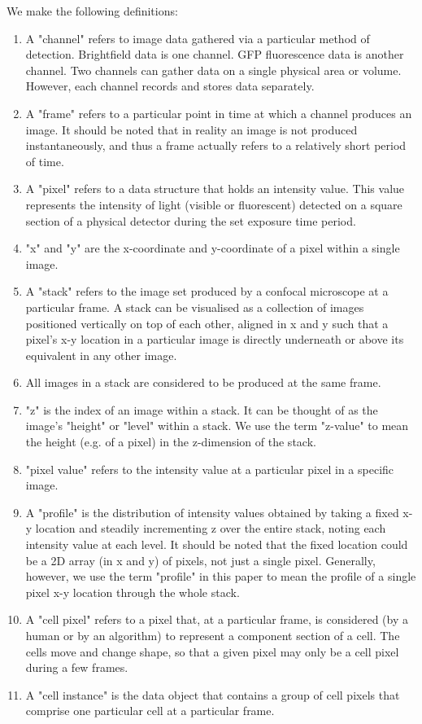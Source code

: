 We make the following definitions:
\begin{enumerate}
\item A "channel" refers to image data gathered via a particular method of detection. Brightfield data is one channel. GFP fluorescence data is another channel. Two channels can gather data on a single physical area or volume. However, each channel records and stores data separately.
\item A "frame" refers to a particular point in time at which a channel produces an image. It should be noted that in reality an image is not produced instantaneously, and thus a frame actually refers to a relatively short period of time.
\item A "pixel" refers to a data structure that holds an intensity value. This value represents the intensity of light (visible or fluorescent) detected on a square section of a physical detector during the set exposure time period.
\item "x" and "y" are the x-coordinate and y-coordinate of a pixel within a single image.
\item A "stack" refers to the image set produced by a confocal microscope at a particular frame. A stack can be visualised as a collection of images positioned vertically on top of each other, aligned in x and y such that a pixel's x-y location in a particular image is directly underneath or above its equivalent in any other image.
\item All images in a stack are considered to be produced at the same frame.
\item "z" is the index of an image within a stack. It can be thought of as the image's "height" or "level" within a stack. We use the term "z-value" to mean the height (e.g. of a pixel) in the z-dimension of the stack.
\item "pixel value" refers to the intensity value at a particular pixel in a specific image.
\item A "profile" is the distribution of intensity values obtained by taking a fixed x-y location and steadily incrementing z over the entire stack, noting each intensity value at each level. It should be noted that the fixed location could be a 2D array (in x and y) of pixels, not just a single pixel. Generally, however, we use the term "profile" in this paper to mean the profile of a single pixel x-y location through the whole stack.
\item A "cell pixel" refers to a pixel that, at a particular frame, is considered (by a human or by an algorithm) to represent a component section of a cell. The cells move and change shape, so that a given pixel may only be a cell pixel during a few frames.
\item A "cell instance" is the data object that contains a group of cell pixels that comprise one particular cell at a particular frame.
\end{enumerate}

